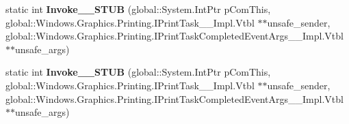 \begin{DoxyCompactItemize}
static int {\bfseries Invoke\+\_\+\+\_\+\+S\+T\+UB} (global\+::\+System.\+Int\+Ptr p\+Com\+This, global\+::\+Windows.\+Graphics.\+Printing.\+I\+Print\+Task\+\_\+\+\_\+\+Impl.\+Vtbl $\ast$$\ast$unsafe\+\_\+sender, global\+::\+Windows.\+Graphics.\+Printing.\+I\+Print\+Task\+Completed\+Event\+Args\+\_\+\+\_\+\+Impl.\+Vtbl $\ast$$\ast$unsafe\+\_\+args)
\item 
\mbox{\label{struct_windows_1_1_foundation_1_1_typed_event_handler___a___windows___graphics___printing___prin4bbc544b6b23befe2861ab142a886e61_a12672c32dd9914a6ecbabd5722a81bcd}} 
static int {\bfseries Invoke\+\_\+\+\_\+\+S\+T\+UB} (global\+::\+System.\+Int\+Ptr p\+Com\+This, global\+::\+Windows.\+Graphics.\+Printing.\+I\+Print\+Task\+\_\+\+\_\+\+Impl.\+Vtbl $\ast$$\ast$unsafe\+\_\+sender, global\+::\+Windows.\+Graphics.\+Printing.\+I\+Print\+Task\+Completed\+Event\+Args\+\_\+\+\_\+\+Impl.\+Vtbl $\ast$$\ast$unsafe\+\_\+args)
\end{DoxyCompactItemize}
